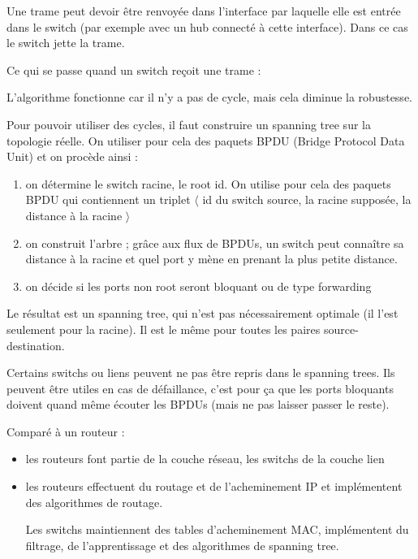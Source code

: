 Une trame peut devoir être renvoyée dans l'interface par laquelle elle est entrée dans le switch (par exemple avec un hub connecté à cette interface). Dans ce cas le switch jette la trame.

Ce qui se passe quand un switch reçoit une trame :


L'algorithme fonctionne car il n'y a pas de cycle, mais cela diminue la robustesse.

Pour pouvoir utiliser des cycles, il faut construire un spanning tree sur la topologie réelle. On utiliser pour cela des paquets BPDU (Bridge Protocol Data Unit) et on procède ainsi :

\begin{enumerate}
	\item on détermine le switch racine, le root id. On utilise pour cela des paquets BPDU qui contiennent un triplet $\langle$ id du switch source, la racine supposée, la distance à la racine $\rangle$
	\item on construit l'arbre ; grâce aux flux de BPDUs, un switch peut connaître sa distance à la racine et quel port y mène en prenant la plus petite distance.
	
	\item on décide si les ports non root seront bloquant ou de type forwarding
\end{enumerate}


Le résultat est un spanning tree, qui n'est pas nécessairement optimale (il l'est seulement pour la racine). Il est le même pour toutes les paires source-destination.

Certains switchs ou liens peuvent ne pas être repris dans le spanning trees. Ils peuvent être utiles en cas de défaillance, c'est pour ça que les ports bloquants doivent quand même écouter les BPDUs (mais ne pas laisser passer le reste).


Comparé à un routeur :

\begin{itemize}	
	\item les routeurs font partie de la couche réseau, les switchs de la couche lien
	\item les routeurs effectuent du routage et de l'acheminement IP et implémentent des algorithmes de routage.
	
	Les switchs maintiennent des tables d'acheminement MAC, implémentent du filtrage, de l'apprentissage et des algorithmes de spanning tree.
\end{itemize}


